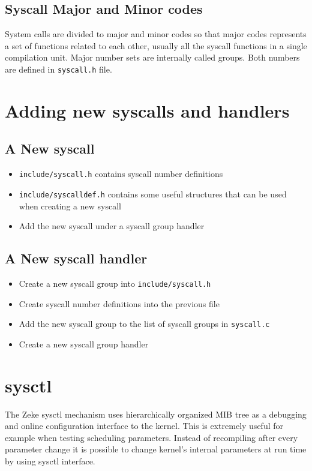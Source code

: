 \section{Syscall Major and Minor codes}

System calls are divided to major and minor codes so that major codes represents
a set of functions related to each other, usually all the syscall functions in a
single compilation unit. Major number sets are internally called groups. Both
numbers are defined in \verb+syscall.h+ file.


\chapter{Adding new syscalls and handlers}

\section{A New syscall}

\begin{itemize}
\item \verb+include/syscall.h+ contains syscall number definitions
\item \verb+include/syscalldef.h+ contains some useful structures that can be used when
      creating a new syscall
\item Add the new syscall under a syscall group handler
\end{itemize}

\section{A New syscall handler}

\begin{itemize}
\item Create a new syscall group into \verb+include/syscall.h+
\item Create syscall number definitions into the previous file
\item Add the new syscall group to the list of syscall groups in \verb+syscall.c+
\item Create a new syscall group handler
\end{itemize}


\chapter{sysctl}

The Zeke sysctl mechanism uses hierarchically organized \ac{MIB} tree as a
debugging and online configuration interface to the kernel. This is extremely
useful for example when testing scheduling parameters. Instead of recompiling
after every parameter change it is possible to change kernel's internal
parameters at run time by using sysctl interface.

